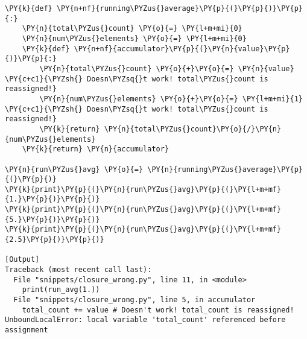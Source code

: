\begin{Verbatim}[label=\makebox{\url{https://github.com/lucabaldini/cmepda/tree/master/slides/latex/snippets/closure\_wrong.py}},commandchars=\\\{\}]
\PY{k}{def} \PY{n+nf}{running\PYZus{}average}\PY{p}{(}\PY{p}{)}\PY{p}{:}
    \PY{n}{total\PYZus{}count} \PY{o}{=} \PY{l+m+mi}{0}
    \PY{n}{num\PYZus{}elements} \PY{o}{=} \PY{l+m+mi}{0}
    \PY{k}{def} \PY{n+nf}{accumulator}\PY{p}{(}\PY{n}{value}\PY{p}{)}\PY{p}{:}
        \PY{n}{total\PYZus{}count} \PY{o}{+}\PY{o}{=} \PY{n}{value} \PY{c+c1}{\PYZsh{} Doesn\PYZsq{}t work! total\PYZus{}count is reassigned!}
        \PY{n}{num\PYZus{}elements} \PY{o}{+}\PY{o}{=} \PY{l+m+mi}{1} \PY{c+c1}{\PYZsh{} Doesn\PYZsq{}t work! total\PYZus{}count is reassigned!}
        \PY{k}{return} \PY{n}{total\PYZus{}count}\PY{o}{/}\PY{n}{num\PYZus{}elements}
    \PY{k}{return} \PY{n}{accumulator}
    
\PY{n}{run\PYZus{}avg} \PY{o}{=} \PY{n}{running\PYZus{}average}\PY{p}{(}\PY{p}{)}
\PY{k}{print}\PY{p}{(}\PY{n}{run\PYZus{}avg}\PY{p}{(}\PY{l+m+mf}{1.}\PY{p}{)}\PY{p}{)}
\PY{k}{print}\PY{p}{(}\PY{n}{run\PYZus{}avg}\PY{p}{(}\PY{l+m+mf}{5.}\PY{p}{)}\PY{p}{)}
\PY{k}{print}\PY{p}{(}\PY{n}{run\PYZus{}avg}\PY{p}{(}\PY{l+m+mf}{2.5}\PY{p}{)}\PY{p}{)}

[Output]
Traceback (most recent call last):
  File "snippets/closure_wrong.py", line 11, in <module>
    print(run_avg(1.))
  File "snippets/closure_wrong.py", line 5, in accumulator
    total_count += value # Doesn't work! total_count is reassigned!
UnboundLocalError: local variable 'total_count' referenced before assignment
\end{Verbatim}